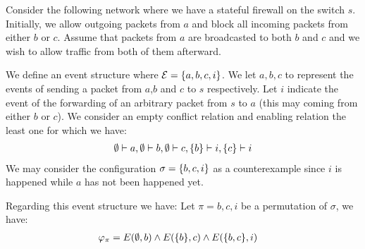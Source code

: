 \begin{example}
    Consider the following network where we have
    a stateful firewall on the switch $s$.
    Initially, we allow outgoing packets from $a$ and
    block all incoming packets from either $b$ or $c$.
    Assume that packets from $a$ are broadcasted to
    both $b$ and $c$ and we wish to allow traffic
    from both of them afterward.
    \begin{center}
    \end{center}
    We define an event structure where
    $\mathcal{E} = \{a,b,c,i\}$.
    We let $a,b,c$ to represent the events of sending
    a packet from $a$,$b$ and $c$ to $s$ respectively.
    Let $i$ indicate the event of the forwarding of
    an arbitrary packet from $s$ to $a$ (this may coming
    from either $b$ or $c$).
    We consider an empty conflict relation and enabling
    relation the least one for which we have:
    \begin{align*}
        \emptyset \vdash a,\emptyset \vdash b, \emptyset \vdash c,
        \{b\} \vdash i, \{c\} \vdash i
    \end{align*}
    We may consider the configuration $\sigma = \{b,c,i\}$ as a
    counterexample since $i$ is happened while $a$ has not been happened yet.
    \begin{center}
    \end{center}
    Regarding this event structure we have:
    Let $\pi = b,c,i$ be a permutation of $\sigma$, we have:
    \begin{align*}
        \varphi_{\pi} & =
        E(\e,b) \wedge E(\s{b},c) \wedge E(\s{b,c},i)

\end{align*}
\end{example}
